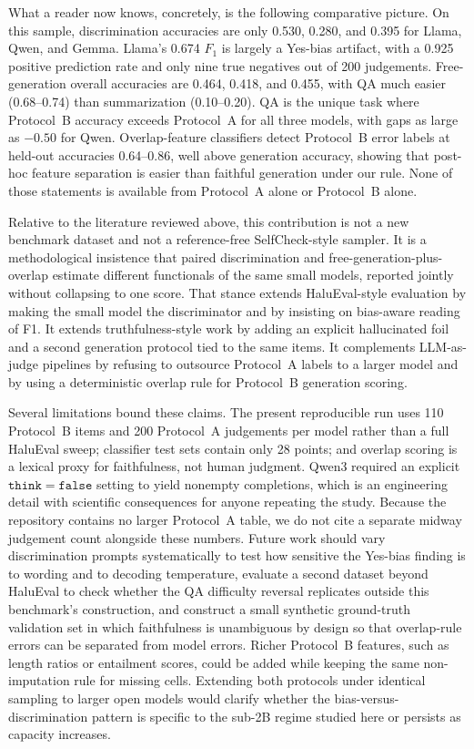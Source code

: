\documentclass[11pt]{article}
\begin{document}
What a reader now knows, concretely, is the following comparative picture. On
this sample, discrimination accuracies are only 0.530, 0.280, and 0.395 for
Llama, Qwen, and Gemma. Llama's 0.674 $F_1$ is largely a Yes-bias artifact,
with a 0.925 positive prediction rate and only nine true negatives out of 200
judgements. Free-generation overall accuracies are 0.464, 0.418, and 0.455,
with QA much easier (0.68--0.74) than summarization (0.10--0.20). QA is the
unique task where Protocol~B accuracy exceeds Protocol~A for all three models,
with gaps as large as $-0.50$ for Qwen. Overlap-feature classifiers detect
Protocol~B error labels at held-out accuracies 0.64--0.86, well above
generation accuracy, showing that post-hoc feature separation is easier than
faithful generation under our rule. None of those statements is available from
Protocol~A alone or Protocol~B alone.

Relative to the literature reviewed above, this contribution is not a new
benchmark dataset and not a reference-free SelfCheck-style sampler. It is a
methodological insistence that paired discrimination and free-generation-plus-
overlap estimate different functionals of the same small models, reported
jointly without collapsing to one score. That stance extends HaluEval-style
evaluation by making the small model the discriminator and by insisting on
bias-aware reading of F1. It extends truthfulness-style work by adding an
explicit hallucinated foil and a second generation protocol tied to the same
items. It complements LLM-as-judge pipelines by refusing to outsource
Protocol~A labels to a larger model and by using a deterministic overlap rule
for Protocol~B generation scoring.

Several limitations bound these claims. The present reproducible run uses 110
Protocol~B items and 200 Protocol~A judgements per model rather than a full
HaluEval sweep; classifier test sets contain only 28 points; and overlap scoring
is a lexical proxy for faithfulness, not human judgment. Qwen3 required an
explicit $\mathtt{think{=}false}$ setting to yield nonempty completions, which
is an engineering detail with scientific consequences for anyone repeating the
study. Because the repository contains no larger Protocol~A table, we do not
cite a separate midway judgement count alongside these numbers. Future work should vary discrimination
prompts systematically to test how sensitive the Yes-bias finding is to wording
and to decoding temperature, evaluate a second dataset beyond HaluEval to check
whether the QA difficulty reversal replicates outside this benchmark's
construction, and construct a small synthetic ground-truth validation set in
which faithfulness is unambiguous by design so that overlap-rule errors can be
separated from model errors. Richer Protocol~B features, such as length ratios
or entailment scores, could be added while keeping the same non-imputation rule
for missing cells. Extending both protocols under identical sampling to larger
open models would clarify whether the bias-versus-discrimination pattern is
specific to the sub-2B regime studied here or persists as capacity increases.
\end{document}
